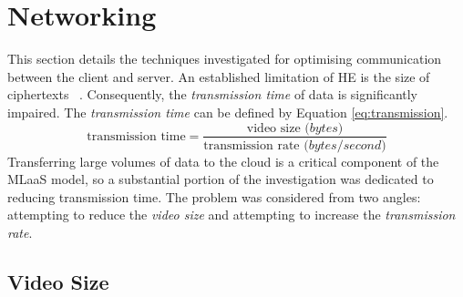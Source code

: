 \section{Networking}
\label{sec:networking}
\setlength{\leftskip}{0.25cm}
\indent \indent
This section details the techniques investigated for optimising communication between the client and server. An established limitation of HE is the size of ciphertexts ~\cite{Makkaoui}. Consequently, the \textit{transmission time} of data is significantly impaired. The \textit{transmission time} can be defined by Equation \ref{eq:transmission}.
\begin{equation}
    \text{transmission time} = \frac{\text{video size }\textit{(bytes)}}{\text{transmission rate }\textit{(bytes/second)}}
    \label{eq:transmission}
\end{equation}
\indent \indent
Transferring large volumes of data to the cloud is a critical component of the MLaaS model, so a substantial portion of the investigation was dedicated to reducing transmission time. The problem was considered from two angles: attempting to reduce the \textit{video size} and attempting to increase the \textit{transmission rate}.

\setlength{\leftskip}{0cm}
\subsection{Video Size}

